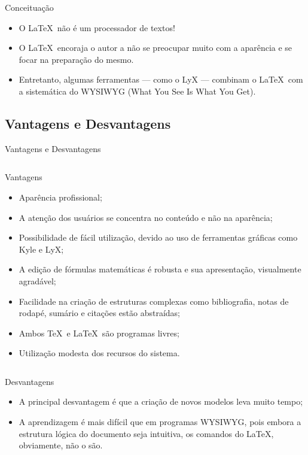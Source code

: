 \begin{frame}{Conceituação}
    \begin{itemize}
    \item<alert@1> O \LaTeX\ não é um processador de textos!
    \item O \LaTeX\ encoraja o autor a não se preocupar muito com a aparência e se focar na preparação do mesmo.
    \item Entretanto, algumas ferramentas — como o LyX — combinam o \LaTeX\ com a sistemática do WYSIWYG (What You See Is What You Get).
    \end{itemize}
\end{frame}

\subsection{Vantagens e Desvantagens}

\begin{frame}[allowframebreaks]{Vantagens e Desvantagens}
    \begin{columns}
    \column{12cm}
    \begin{block}{Vantagens}
        \begin{itemize}
        \item Aparência profissional;
        \item A atenção dos usuários se concentra no conteúdo e não na aparência;
        \item Possibilidade de fácil utilização, devido ao uso de ferramentas gráficas como Kyle e LyX;
        \item A edição de fórmulas matemáticas é robusta e sua apresentação, visualmente agradável;
        \item Facilidade na criação de estruturas complexas como bibliografia, notas de rodapé, sumário e citações estão abstraídas;
        \item Ambos \TeX\ e \LaTeX\ são programas livres;
        \item Utilização modesta dos recursos do sistema.
        \end{itemize}
    \end{block}
    \end{columns}

    \begin{block}{Desvantagens}
        \begin{itemize}
        \item A principal desvantagem é que a criação de novos modelos leva muito tempo;
        \item A aprendizagem é mais difícil que em programas WYSIWYG, pois embora a estrutura lógica do documento seja intuitiva, os comandos do LaTeX, obviamente, não o são.
        \end{itemize}
    \end{block}
\end{frame}

